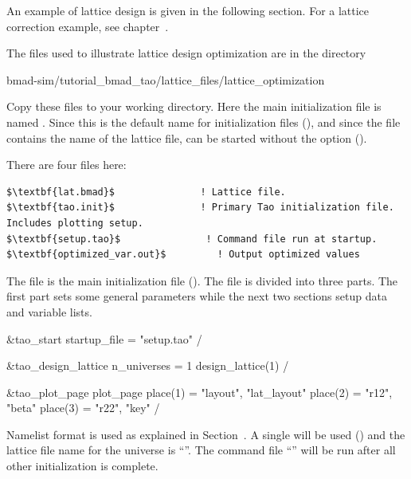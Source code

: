 \documentclass{hitec}     %
\begin{document}
An example of lattice design is given in the following section. For a lattice correction example, see 
chapter~.

The files used to illustrate lattice design optimization are in the directory 
\begin{code}
bmad-sim/tutorial_bmad_tao/lattice_files/lattice_optimization
\end{code}
Copy these files to your working directory. Here the main initialization file is named
. Since this is the default name for initialization files (), and
since the  file contains the name of the lattice file, \tao can be started without the
 option ().

There are four files here:
\begin{lstlisting}[mathescape]
$\textbf{lat.bmad}$               ! Lattice file.
$\textbf{tao.init}$               ! Primary Tao initialization file. Includes plotting setup.
$\textbf{setup.tao}$               ! Command file run at startup.
$\textbf{optimized_var.out}$         ! Output optimized values
\end{lstlisting}

The file  is the main initialization file (). The file is divided
into three parts. The first part sets some general parameters while the next two sections setup data
 and variable  lists.
\begin{code}
&tao_start
  startup_file = "setup.tao"
/

&tao_design_lattice
  n_universes = 1
  design_lattice(1)%
/

&tao_plot_page
  plot_page%
  place(1) = "layout", "lat_layout"
  place(2) = "r12", "beta"
  place(3) = "r22", "key"
/
\end{code}
Namelist format is used as explained in Section~. A single  will be
used () and the lattice file name for the universe is ``''. The
command file ``'' will be run after all other initialization is complete.
\end{document}

